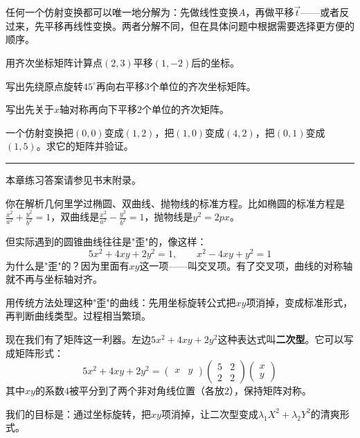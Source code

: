 \documentclass[a4paper,12pt]{ctexart}
\begin{document}

任何一个仿射变换都可以唯一地分解为：先做线性变换$A$，再做平移$\vec t$——或者反过来，先平移再线性变换。两者分解不同，但在具体问题中根据需要选择更方便的顺序。

\begin{exercise}[仿射变换练习]
\item 用齐次坐标矩阵计算点$(2,3)$平移$(1,-2)$后的坐标。
\item 写出先绕原点旋转$45^\circ$再向右平移$3$个单位的齐次坐标矩阵。
\item 写出先关于$x$轴对称再向下平移$2$个单位的齐次矩阵。
\item 一个仿射变换把$(0,0)$变成$(1,2)$，把$(1,0)$变成$(4,2)$，把$(0,1)$变成$(1,5)$。求它的矩阵并验证。
\end{exercise}

\vfill
\noindent\rule{\textwidth}{0.4pt}
本章练习答案请参见书末附录。

\newpage



你在解析几何里学过椭圆、双曲线、抛物线的标准方程。比如椭圆的标准方程是$\frac{x^2}{a^2}+\frac{y^2}{b^2}=1$，双曲线是$\frac{x^2}{a^2}-\frac{y^2}{b^2}=1$，抛物线是$y^2=2px$。

但实际遇到的圆锥曲线往往是"歪"的，像这样：
\[
5x^2+4xy+2y^2=1,\qquad
x^2-4xy+y^2=1
\]
为什么是"歪"的？因为里面有$xy$这一项——叫交叉项。有了交叉项，曲线的对称轴就不再与坐标轴对齐。

用传统方法处理这种"歪"的曲线：先用坐标旋转公式把$xy$项消掉，变成标准形式，再判断曲线类型。过程相当繁琐。

现在我们有了矩阵这一利器。左边$5x^2+4xy+2y^2$这种表达式叫\textbf{二次型}。它可以写成矩阵形式：
\[
5x^2+4xy+2y^2=
\begin{pmatrix}x&y\end{pmatrix}
\begin{pmatrix}5&2\\2&2\end{pmatrix}
\begin{pmatrix}x\\y\end{pmatrix}
\]
其中$xy$的系数$4$被平分到了两个非对角线位置（各放$2$），保持矩阵对称。


我们的目标是：通过坐标旋转，把$xy$项消掉，让二次型变成$\lambda_1X^2+\lambda_2Y^2$的清爽形式。
\end{document}
